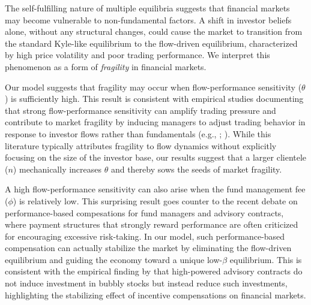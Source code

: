 The self-fulfilling nature of multiple equilibria suggests that financial markets may become vulnerable to non-fundamental factors. A shift in investor beliefs alone, without any structural changes, could cause the market to transition from the standard Kyle-like equilibrium to the flow-driven equilibrium, characterized by high price volatility and poor trading performance.
We interpret this phenomenon as a form of \textit{fragility} in financial markets. 

Our model suggests that fragility may occur when flow-performance sensitivity ($\theta$) is sufficiently high. This result is consistent with empirical studies documenting that strong flow-performance sensitivity can amplify trading pressure and contribute to market fragility by inducing managers to adjust trading behavior in response to investor flows rather than fundamentals (e.g., \citealp*{coval2007assetfiresales}; \citealp*{goldstein2017investorflows}). While this literature typically attributes fragility to flow dynamics without explicitly focusing on the size of the investor base, our results suggest that a larger clientele ($n$) mechanically increases $\theta$ and thereby sows the seeds of market fragility.

A high flow-performance sensitivity can also arise when the fund management fee ($\phi$) is relatively low. This surprising result goes counter to the recent debate on performance-based compesations for fund managers and advisory contracts, where payment structures that strongly reward performance are often criticized for encouraging excessive risk-taking. In our model, such performance-based compensation can actually stabilize the market by eliminating the flow-driven equilibrium and guiding the economy toward a unique low-$\beta$ equilibrium. This is consistent with the empirical finding by \citet*{dass2008mutual} that high-powered advisory contracts do not induce investment in bubbly stocks but instead reduce such investments, highlighting the stabilizing effect of incentive compensations on financial markets.


